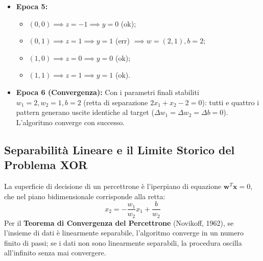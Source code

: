 \begin{itemize}
\begin{itemize}
        \item $(1,1) \implies z=0 \implies y=0$ (err) $\implies w=(2,2), b=1$.
    \end{itemize}
    \item \textbf{Epoca 5:}
    \begin{itemize}
        \item $(0,0) \implies z=-1 \implies y=0$ (ok);
        \item $(0,1) \implies z=1 \implies y=1$ (err) $\implies w=(2,1), b=2$;
        \item $(1,0) \implies z=0 \implies y=0$ (ok);
        \item $(1,1) \implies z=1 \implies y=1$ (ok).
    \end{itemize}
    \item \textbf{Epoca 6 (Convergenza):}
    Con i parametri finali stabiliti $w_1 = 2, w_2 = 1, b = 2$ (retta di separazione $2x_1 + x_2 - 2 = 0$):
    tutti e quattro i pattern generano uscite identiche al target ($\Delta w_1 = \Delta w_2 = \Delta b = 0$). L'algoritmo converge con successo.
\end{itemize}

\FloatBarrier
\subsection{Separabilità Lineare e il Limite Storico del Problema XOR}
\label{subsec:dm-xor-problem}

La superficie di decisione di un percettrone è l'iperpiano di equazione $\mathbf{w}^T \mathbf{x} = 0$, che nel piano bidimensionale corrisponde alla retta:
\begin{equation}
    x_2 = -\frac{w_1}{w_2} x_1 + \frac{b}{w_2}
\end{equation}
Per il \textbf{Teorema di Convergenza del Percettrone} (Novikoff, 1962), se l'insieme di dati è linearmente separabile, l'algoritmo converge in un numero finito di passi; se i dati non sono linearmente separabili, la procedura oscilla all'infinito senza mai convergere.

